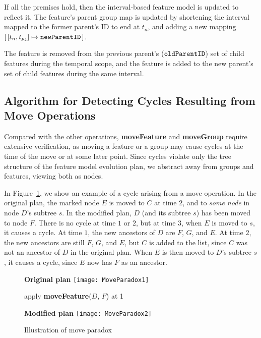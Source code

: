 If all the premises hold, then the interval-based feature model is updated to reflect it. The feature's parent group map is updated by shortening the interval mapped to the former parent's ID to end at $t_n$, and adding a new mapping $\intervalmapping{t_n}{t_{p_2}}{\var{newParentID}}$.

The feature is removed from the previous parent's ($\texttt{oldParentID}$) set of child features during the temporal scope, and the feature is added to the new parent's set of child features during the same interval. 


\subsection{Algorithm for Detecting Cycles Resulting from \textbf{Move} Operations}
\label{sub:move-algorithm}

Compared with the other operations, \textbf{moveFeature} and \textbf{moveGroup} require extensive verification, as moving a feature or a group may cause cycles at the time of the move or at some later point. Since cycles violate only the tree structure of the feature model evolution plan, we abstract away from groups and features, viewing both as nodes.  

In Figure~\ref{ex:illustration-move-algo}, we show an example of a cycle arising from a move operation. In the original plan, the marked node $E$ is moved to $C$ at time 2, and to \emph{some node} in node $D$'s subtree $s$. In the modified plan, $D$ (and its subtree $s$) has been moved to node $F$. There is no cycle at time $1$ or $2$, but at time 3, when $E$ is moved to $s$, it causes a cycle. At time $1$, the new ancestors of $D$ are $F$, $G$, and $E$. At time $2$, the new ancestors are still $F$, $G$, and $E$, but $C$ is added to the list, since $C$ was not an ancestor of $D$ in the original plan. When $E$ is then moved to $D$'s subtree $s$, it causes a cycle, since $E$ now has $F$ as an ancestor.

\begin{figure}[htpb]
  \centering
  \textbf{Original plan}
  \texttt{[image: MoveParadox1]}
  \bigskip

  apply \textbf{moveFeature}($D$, $F$) at 1
  \bigskip 
  
  \textbf{Modified plan}
  \texttt{[image: MoveParadox2]}
  \caption{Illustration of move paradox}
  \label{ex:illustration-move-algo}
\end{figure}

